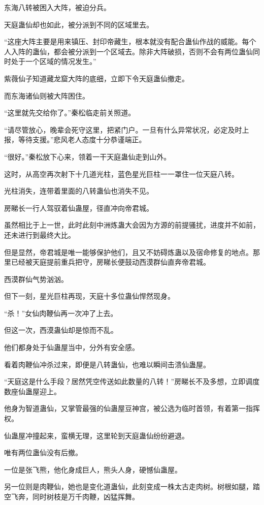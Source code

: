 \begin{this_body}
东海八转被困入大阵，被迫分兵。

天庭蛊仙却也如此，被分派到不同的区域里去。

“这座大阵主要是用来镇压、封印帝藏生，根本就没有配合蛊仙作战的威能。每个人入阵的蛊仙，都会被分派到一个区域去。除非大阵破损，否则不会有两位蛊仙同时处于一个区域的情况发生。”

紫薇仙子知道藏龙窟大阵的底细，立即下令天庭蛊仙撤走。

而东海诸仙则被大阵困住。

“这里就先交给你了。”秦松临走前关照道。

“请尽管放心，晚辈会死守这里，把紧门户。一旦有什么异常状况，必定及时上报，等待支援。”悲风老人态度十分恭谨端正。

“很好。”秦松放下心来，领着一干天庭蛊仙走到山外。

这时，从高空再次射下十几道光柱，蓝色星光巨柱一一罩住一位天庭八转。

光柱消失，连带着里面的八转蛊仙也消失不见。

房睇长一行人驾驭着仙蛊屋，径直冲向帝君城。

虽然相比于上一世，此时此刻中洲炼蛊大会因为方源的前提骚扰，进度并不如前，还未进行到最终大比。

但是显然，帝君城是唯一能够保护他们，且又不妨碍炼蛊以及宿命修复的地点。那里已经被天庭提前重兵把守，房睇长便鼓动西漠群仙直奔帝君城。

西漠群仙气势汹汹。

但下一刻，星光巨柱再现，天庭十多位蛊仙悍然现身。

“杀！”女仙肉鞭仙再一次冲了上去。

但这一次，西漠蛊仙却是惊而不乱。

他们都身处于仙蛊屋当中，分外有安全感。

看着肉鞭仙冲杀过来，即便是八转蛊仙，也难以瞬间击溃仙蛊屋。

“天庭这是什么手段？居然凭空传送如此数量的八转！”房睇长不及多想，立即调度数座仙蛊屋迎上。

他身为智道蛊仙，又掌管最强的仙蛊屋豆神宫，被公选为临时首领，有着第一指挥权。

仙蛊屋冲撞起来，蛮横无理，这里轮到天庭蛊仙纷纷避退。

唯有两位蛊仙没有后撤。

一位是张飞熊，他化身成巨人，熊头人身，硬憾仙蛊屋。

另一位则是肉鞭仙，她也是变化道蛊仙，此刻变成一株太古走肉树。树根如腿，踏空飞奔，同时树枝是万千肉鞭，凶猛挥舞。


\end{this_body}
